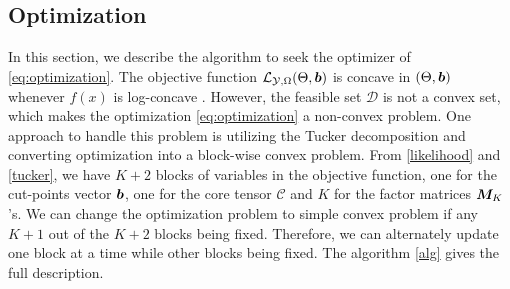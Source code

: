 \documentclass{article}
\theoremstyle{plain}
\theoremstyle{definition}
\begin{document}
\subsection{Optimization}
In this section, we describe the algorithm to seek the optimizer of \eqref{eq:optimization}. The objective function $\mathcal{L}_{\mathcal{Y},\Omega}(\Theta,\bm{b})$ is concave in $(\Theta,\bm{b})$ whenever $f(x)$ is log-concave \citep{mccullagh1980regression,burridge1981note}.
However, the feasible set $\mathcal{D}$ is not a convex set, which makes the optimization \eqref{eq:optimization} a non-convex problem. One approach to handle this problem is utilizing the Tucker decomposition and converting optimization into a block-wise convex problem.
From \eqref{likelihood} and \eqref{tucker}, we have $K+2$ blocks of variables in the objective function, one for the cut-points vector $\bm{b}$, one for the core tensor $\mathcal{C}$ and  $K$ for the factor matrices $\bm M_K$'s.
We can change the optimization problem to simple convex problem if any $K+1$ out of the $K+2$ blocks being fixed. Therefore, we can alternately update one block at a time while other blocks being fixed.
The algorithm \ref{alg} gives the full description.
\end{document}
